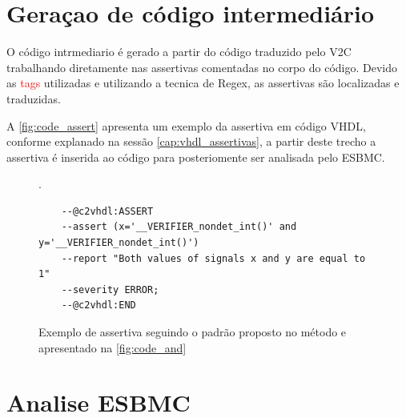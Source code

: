 \section{Geraçao de código intermediário} 
\par
O código intrmediario é gerado a partir do código traduzido pelo V2C trabalhando diretamente nas assertivas comentadas no corpo do código. Devido as \textcolor{red}{tags} utilizadas e utilizando a tecnica de Regex, as assertivas são localizadas e traduzidas.

\par
A \autoref{fig:code_assert} apresenta um exemplo da assertiva em código VHDL, conforme explanado na sessão \autoref{cap:vhdl_assertivas}, a partir deste trecho a assertiva é inserida ao código para posteriomente ser analisada pelo ESBMC.

\begin{figure}[thp]
\caption{\label{fig:code_assert} Exemplo de assertiva seguindo o padrão proposto no método e apresentado na \autoref{fig:code_and}}. 
	\begin{center}
    \begin{minipage}{0.7\textwidth}
    \begin{lstlisting}       	
    --@c2vhdl:ASSERT
    --assert (x='__VERIFIER_nondet_int()' and y='__VERIFIER_nondet_int()')
    --report "Both values of signals x and y are equal to 1"
    --severity ERROR;
    --@c2vhdl:END
\end{lstlisting}
    \end{minipage}
	\end{center}
\end{figure}

\section{Analise ESBMC}

